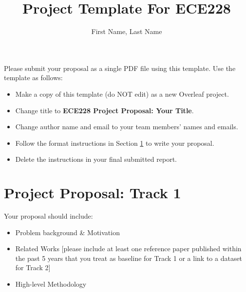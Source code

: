 \documentclass{article}
\title{Project Template For ECE228}
\author{%
  First Name, Last Name
}
\begin{document}
\maketitle


\noindent Please submit your proposal as a single PDF file using this template. Use the template as follows:
\begin{itemize}
    \item Make a copy of this template (do NOT edit) as a new Overleaf project.
    \item Change title to \textbf{ECE228 Project Proposal: Your Title}.
    \item Change author name and email to your  team members' names and emails.
    \item Follow the format instructions in Section \ref{sec:1} to write your proposal.
    \item Delete the instructions in your final submitted report.
\end{itemize}


\section{Project Proposal: Track 1}\label{sec:1}

Your proposal should include:
\begin{itemize}
    \item Problem background \& Motivation
    \item Related Works [please include at least one reference paper published within the past 5 years that you treat as baseline for Track 1 or a link to a dataset for Track 2]
    \item High-level Methodology
\end{itemize}
\end{document}
